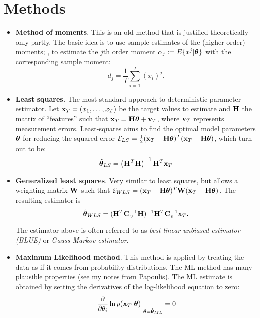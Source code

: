 \documentclass[a4paper, one	side]{book}
\begin{document}
\section{Methods}
\begin{itemize}
\item \textbf{Method of moments}. This is an old method that is justified theoretically only partly. The basic idea is to use sample estimates of the (higher-order) moments; \eg, to estimate the $j$th order moment $\alpha_j:=E\{x^j|\boldsymbol{\theta}\}$ with the corresponding sample moment:%
$$ d_j=\frac{1}{T}\sum\limits_{i=1}^T (x_i)^j  .$$
\item \textbf{Least squares.}  The most standard approach to deterministic parameter estimator. Let $\mathbf{x}_T=(x_1,\hdots,x_T)$ be the target values to estimate and $\mathbf{H}$ the matrix of ``features'' such that $\mathbf{x}_T = \mathbf{H}\boldsymbol{\theta} + \mathbf{v}_T $, where $\mathbf{v}_T$ represents measurement errors. Least-squares aims to find the optimal model parameters $\boldsymbol \theta$ for reducing the squared error $\mathcal{E}_{LS}=\frac{1}{2}(\mathbf{x}_T-\mathbf H \boldsymbol \theta)^T(\mathbf{x}_T-\mathbf H \boldsymbol \theta)$, which turn out to be:%
 $$\boldsymbol{\hat{\theta}}_{LS}=\left(\mathbf{H}^T\mathbf H\right)^{-1}\mathbf{H}^T\mathbf{x}_T$$ 
\item \textbf{Generalized least squares}. Very similar to least squares, but allows a weighting matrix $\mathbf{W}$ such that $\mathcal{E}_{WLS} = (\mathbf{x}_T-\mathbf H \boldsymbol \theta)^T\mathbf W (\mathbf{x}_T-\mathbf H \boldsymbol \theta)$. The resulting estimator is $$\hat{\boldsymbol \theta}_{WLS}=(\mathbf H^T\mathbf{C}_v^{-1}\mathbf H)^{-1} \mathbf{H}^T \mathbf{C}_v^{-1} \mathbf{x}_T.$$

The estimator above is often referred to as \textit{best linear unbiased estimator (BLUE)} or \textit{Gauss-Markov estimator}.
\item \textbf{Maximum Likelihood method}. This method is applied by treating the data as if it comes from probability distributions. The ML method has many plausible properties (see my notes from Papoulis). The ML estimate is obtained by setting the derivatives of the log-likelihood equation to zero: %
$$\left.\frac{\partial}{\partial \theta_i}\ln p(\mathbf{x}_T | \boldsymbol{\theta})\right|_{\boldsymbol{\theta}=\hat{\boldsymbol{\theta}}_{ML}}=0$$
\end{itemize}
\end{document}
